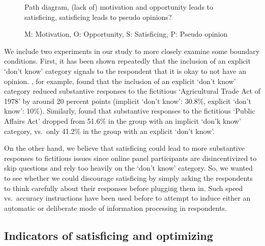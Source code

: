 \documentclass[Royal,times,sageh]{sagej}
\begin{document}
\begin{figure}
\centering
\caption{Path diagram, (lack of) motivation and opportunity leads to satisficing, satisficing leads to pseudo opinions?}
\caption*{\footnotesize M: Motivation, O: Opportunity, S: Satisficing, P: Pseudo opinion}
\end{figure}

We include two experiments in our study to more closely examine some
boundary conditions. First, it has been shown repeatedly that the
inclusion of an explicit `don't know' category signals to the respondent
that it is okay to not have an opinion. \citet{Schuman1980}, for
example, found that the inclusion of an explicit `don't know' category
reduced substantive responses to the fictitious `Agricultural Trade Act
of 1978' by around 20 percent points (implicit `don't know': 30.8\%,
explicit `don't know': 10\%). Similarly, \citet{Bishop1983} found that
substantive responses to the fictitious `Public Affairs Act' dropped
from 51.6\% in the group with an implicit `don'k know' category,
vs.~only 41.2\% in the group with an explicit `don't know'.

On the other hand, we believe that satisficing could lead to more
substantive responses to fictitious issues since online panel
participants are disincentivized to skip questions and rely too heavily
on the `don't know' category. So, we wanted to see whether we could
discourage satisficing by simply asking the respondents to think
carefully about their responses before plugging them in. Such speed
vs.~accuracy instructions have been used before
\citep{Fazio1990b, Mayerl2009} to attempt to induce either an automatic
or deliberate mode of information processing in respondents.

\hypertarget{indicators-of-satisficing-and-optimizing}{%
\subsection{Indicators of satisficing and
optimizing}\label{indicators-of-satisficing-and-optimizing}}
\end{document}
